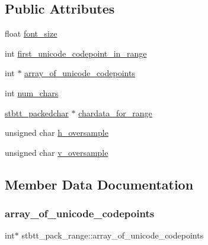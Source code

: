 \subsection*{Public Attributes}
\begin{DoxyCompactItemize}
\item 
float \hyperlink{structstbtt__pack__range_a296916dc971e5e7627822fe98dc42828}{font\+\_\+size}
\item 
int \hyperlink{structstbtt__pack__range_a3b414cbee1e164c29dd138e0ae3d5759}{first\+\_\+unicode\+\_\+codepoint\+\_\+in\+\_\+range}
\item 
int $\ast$ \hyperlink{structstbtt__pack__range_a1567aa5455e1251529a91b46261368cf}{array\+\_\+of\+\_\+unicode\+\_\+codepoints}
\item 
int \hyperlink{structstbtt__pack__range_a046d65b6ffb65fb998d471ba098e2e23}{num\+\_\+chars}
\item 
\hyperlink{structstbtt__packedchar}{stbtt\+\_\+packedchar} $\ast$ \hyperlink{structstbtt__pack__range_aa8f7ddd637ed341ea39b08466fab9284}{chardata\+\_\+for\+\_\+range}
\item 
unsigned char \hyperlink{structstbtt__pack__range_a7a642139ce446c58fde5c48553bcf008}{h\+\_\+oversample}
\item 
unsigned char \hyperlink{structstbtt__pack__range_a6288f14006e257544db3d015c32b4113}{v\+\_\+oversample}
\end{DoxyCompactItemize}


\subsection{Member Data Documentation}
\mbox{\label{structstbtt__pack__range_a1567aa5455e1251529a91b46261368cf}} 
\subsubsection{\texorpdfstring{array\+\_\+of\+\_\+unicode\+\_\+codepoints}{array\_of\_unicode\_codepoints}}
{\footnotesize\ttfamily int$\ast$ stbtt\+\_\+pack\+\_\+range\+::array\+\_\+of\+\_\+unicode\+\_\+codepoints}

\mbox{\label{structstbtt__pack__range_aa8f7ddd637ed341ea39b08466fab9284}} 
